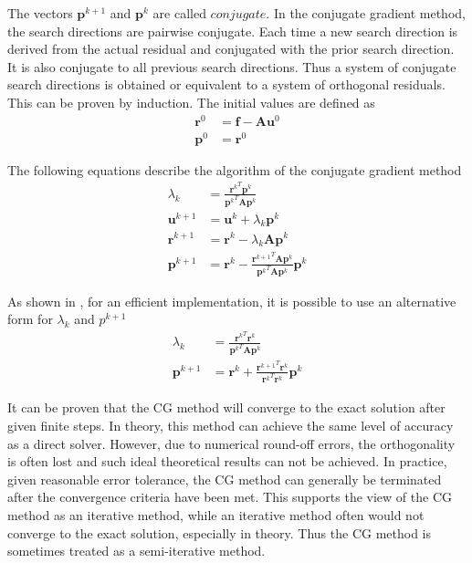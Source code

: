 The vectors $\boldsymbol{p}^{k+1}$ and $\boldsymbol{p}^k$ are called $conjugate$. In the conjugate gradient method, the search directions are pairwise conjugate. Each time a new search direction is derived from the actual residual and conjugated with the prior search direction. It is also conjugate to all previous search directions. Thus a system of conjugate search directions is obtained or equivalent to a system of orthogonal residuals. This can be proven by induction.
The initial values are defined as
\begin{align}
    \boldsymbol{r}^0 &= \boldsymbol{f} - \boldsymbol{A}\boldsymbol{u}^0 \nonumber \\ \boldsymbol{p}^0 &= \boldsymbol{r}^0
\end{align}

The following equations describe the algorithm of the conjugate gradient method
\begin{align}
    \lambda_k &= \frac{{\boldsymbol{r}^k}^T\boldsymbol{p}^k}{{\boldsymbol{p}^k}^T\boldsymbol{A}\boldsymbol{p}^k} \\
    \boldsymbol{u}^{k+1} &= \boldsymbol{u}^k + \lambda_k\boldsymbol{p}^k \\
    \boldsymbol{r}^{k+1} &= \boldsymbol{r}^k - \lambda_k\boldsymbol{A}\boldsymbol{p}^k \\
    \boldsymbol{p}^{k+1} &= \boldsymbol{r}^k - \frac{{\boldsymbol{r}^{k+1}}^T\boldsymbol{A}\boldsymbol{p}^k}{{\boldsymbol{p}^k}^T \boldsymbol{A}\boldsymbol{p}^k} \boldsymbol{p}^k %
\end{align}

As shown in \citep{https://doi.org/10.1002/zamm.19940740205}, for an efficient implementation, it is possible to use an alternative form for $\lambda_k$ and $p^{k+1}$
\begin{align}
     \lambda_k &= \frac{{\boldsymbol{r}^k}^T\boldsymbol{r}^k}{{\boldsymbol{p}^k}^T\boldsymbol{A}\boldsymbol{p}^k} \\
     \boldsymbol{p}^{k+1} &= \boldsymbol{r}^k + \frac{{\boldsymbol{r}^{k+1}}^T\boldsymbol{r}^k}{{\boldsymbol{r}^k}^T\boldsymbol{r}^k}\boldsymbol{p}^k
\end{align}

It can be proven that the CG method will converge to the exact solution after given finite steps. In theory, this method can achieve the same level of accuracy as a direct solver. However, due to numerical round-off errors, the orthogonality is often lost and such ideal theoretical results can not be achieved. In practice, given reasonable error tolerance, the CG method can generally be terminated after the convergence criteria have been met. This supports the view of the CG method as an iterative method, while an iterative method often would not converge to the exact solution, especially in theory. Thus the CG method is sometimes treated as a semi-iterative method.